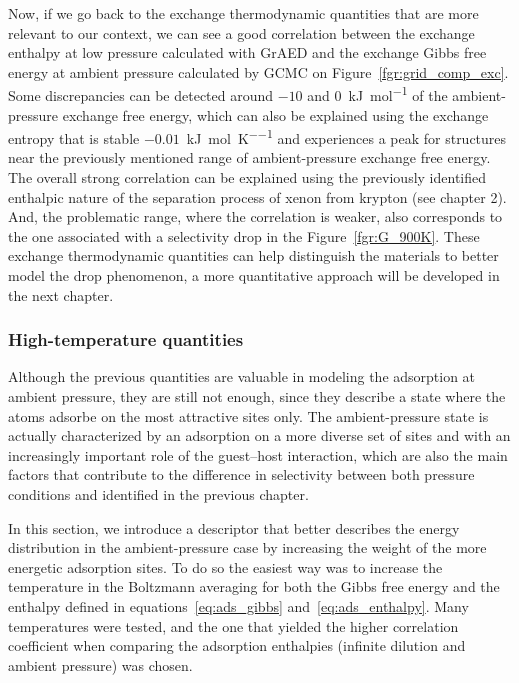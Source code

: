 \documentclass[main]{subfiles}
\begin{document}
Now, if we go back to the exchange thermodynamic quantities that are more relevant to our context, we can see a good correlation between the exchange enthalpy at low pressure calculated with GrAED and the exchange Gibbs free energy at ambient pressure calculated by GCMC on Figure~\ref{fgr:grid_comp_exc}. Some discrepancies can be detected around $-10$ and $0$~\si{\kilo\joule\per\mole} of the ambient-pressure exchange free energy, which can also be explained using the exchange entropy that is stable $-0.01$~\si{\kilo\joule\per\mole\per\kelvin} and experiences a peak for structures near the previously mentioned range of ambient-pressure exchange free energy. The overall strong correlation can be explained using the previously identified enthalpic nature of the separation process of xenon from krypton (see chapter 2). And, the problematic range, where the correlation is weaker, also corresponds to the one associated with a selectivity drop in the Figure~\ref{fgr:G_900K}. These exchange thermodynamic quantities can help distinguish the materials to better model the drop phenomenon, a more quantitative approach will be developed in the next chapter.


\subsubsection{High-temperature quantities}

Although the previous quantities are valuable in modeling the adsorption at ambient pressure, they are still not enough, since they describe a state where the atoms adsorbe on the most attractive sites only. The ambient-pressure state is actually characterized by an adsorption on a more diverse set of sites and with an increasingly important role of the guest--host interaction, which are also the main factors that contribute to the difference in selectivity between both pressure conditions and identified in the previous chapter.

In this section, we introduce a descriptor that better describes the energy distribution in the ambient-pressure case by increasing the weight of the more energetic adsorption sites. To do so the easiest way was to increase the temperature in the Boltzmann averaging for both the Gibbs free energy and the enthalpy defined in equations~\ref{eq:ads_gibbs} and~\ref{eq:ads_enthalpy}. Many temperatures were tested, and the one that yielded the higher correlation coefficient when comparing the adsorption enthalpies (infinite dilution and ambient pressure) was chosen. 
\end{document}
